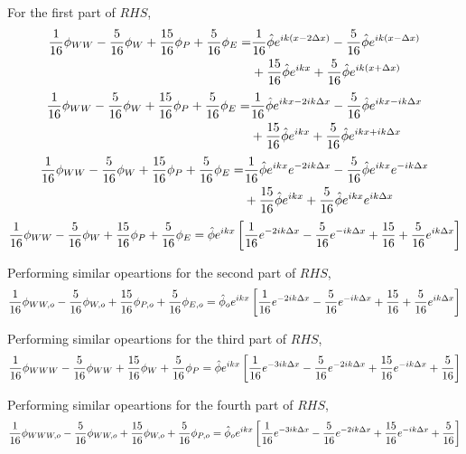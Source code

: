 \documentclass[a4paper, 12pt]{report}
\begin{document}
\begin{center}
For the first part of $RHS$,
\begin{equation*}
\begin{split}
\frac{1}{16}\phi_{WW} - \frac{5}{16}\phi_{W} + \frac{15}{16}\phi_{P} + \frac{5}{16}\phi_{E} = & \frac{1}{16}\hat{\phi}e^{ik(x - 2\Delta x)} - \frac{5}{16}\hat{\phi}e^{ik(x - \Delta x)}       
\\ &+ \frac{15}{16}\hat{\phi}e^{ikx} + \frac{5}{16}\hat{\phi}e^{ik(x + \Delta x)}
\end{split}
\end{equation*}
\begin{equation*}
\begin{split}
\frac{1}{16}\phi_{WW} - \frac{5}{16}\phi_{W} + \frac{15}{16}\phi_{P} + \frac{5}{16}\phi_{E} = & \frac{1}{16}\hat{\phi}e^{ikx - 2ik\Delta x} - \frac{5}{16}\hat{\phi}e^{ikx - ik\Delta x}       
\\ &+ \frac{15}{16}\hat{\phi}e^{ikx} + \frac{5}{16}\hat{\phi}e^{ikx + ik\Delta x}
\end{split}
\end{equation*}
\begin{equation*}
\begin{split}
\frac{1}{16}\phi_{WW} - \frac{5}{16}\phi_{W} + \frac{15}{16}\phi_{P} + \frac{5}{16}\phi_{E} = & \frac{1}{16}\hat{\phi}e^{ikx}e^{-2ik\Delta x} - \frac{5}{16}\hat{\phi}e^{ikx}e^{-ik\Delta x}       
\\ &+ \frac{15}{16}\hat{\phi}e^{ikx} + \frac{5}{16}\hat{\phi}e^{ikx}e^{ik\Delta x}         
\end{split}
\end{equation*}
$$\frac{1}{16}\phi_{WW} - \frac{5}{16}\phi_{W} + \frac{15}{16}\phi_{P} + \frac{5}{16}\phi_{E} = \hat{\phi}e^{ikx}\left[\frac{1}{16}e^{-2ik\Delta x} - \frac{5}{16}e^{-ik\Delta x} + \frac{15}{16} + \frac{5}{16}e^{ik\Delta x}\right]$$ 

Performing similar opeartions for the second part of $RHS$,
$$\frac{1}{16}\phi_{WW,o} - \frac{5}{16}\phi_{W,o} + \frac{15}{16}\phi_{P,o} + \frac{5}{16}\phi_{E,o} = \hat{\phi}_oe^{ikx}\left[\frac{1}{16}e^{-2ik\Delta x} - \frac{5}{16}e^{-ik\Delta x} + \frac{15}{16} + \frac{5}{16}e^{ik\Delta x}\right]$$

Performing similar opeartions for the third part of $RHS$,
$$\frac{1}{16}\phi_{WWW} - \frac{5}{16}\phi_{WW} + \frac{15}{16}\phi_{W} + \frac{5}{16}\phi_{P} = \hat{\phi}e^{ikx}\left[\frac{1}{16}e^{-3ik\Delta x} - \frac{5}{16}e^{-2ik\Delta x} + \frac{15}{16}e^{-ik\Delta x} + \frac{5}{16}\right]$$

Performing similar opeartions for the fourth part of $RHS$,$$\frac{1}{16}\phi_{WWW,o} - \frac{5}{16}\phi_{WW,o} + \frac{15}{16}\phi_{W,o} + \frac{5}{16}\phi_{P,o} = \hat{\phi}_oe^{ikx}\left[\frac{1}{16}e^{-3ik\Delta x} - \frac{5}{16}e^{-2ik\Delta x} + \frac{15}{16}e^{-ik\Delta x} + \frac{5}{16}\right]$$
   

\end{center}
\end{document}
